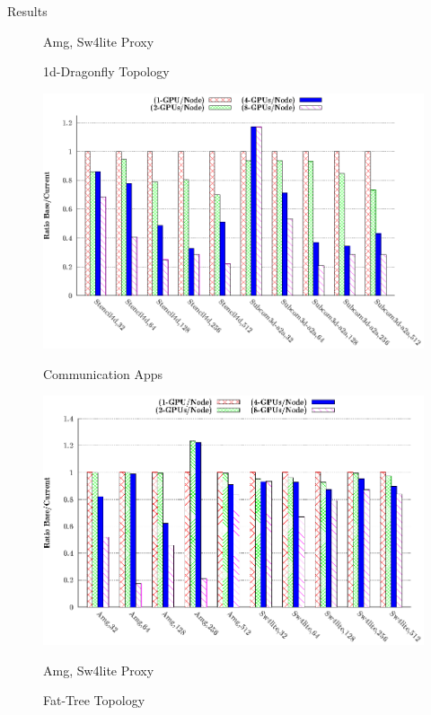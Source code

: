 \documentclass[final]{beamer}
\newlength{\onecolwid}
\newlength{\twocolwid}
\begin{document}
\begin{frame}[t]
\begin{columns}[t]
\begin{column}{\twocolwid}
\begin{columns}[t,totalwidth=\twocolwid]
\begin{column}{\onecolwid}
\begin{block}{Results}
\begin{figure}
\begin{minipage}{.45\textwidth}
\captionsetup{labelformat=empty}
\caption{Amg, Sw4lite Proxy}
\label{fig:13b}
\end{minipage}
\captionsetup{labelformat=empty}
\caption{1d-Dragonfly Topology}
\end{figure}

\begin{figure}
\centering
\begin{minipage}{.45\textwidth}
\centering
\includegraphics[width=1\linewidth]{figs/ftree-x-mapping-comm.eps}
\captionsetup{labelformat=empty}
\caption{Communication Apps}
\label{fig:13a}
\end{minipage}
\begin{minipage}{.45\textwidth}
\centering
\includegraphics[width=1\linewidth]{figs/ftree-x-mapping-comp-new.eps}
\captionsetup{labelformat=empty}
\caption{Amg, Sw4lite Proxy}
\label{fig:13b}
\end{minipage}
\captionsetup{labelformat=empty}
\caption{Fat-Tree Topology}
\end{figure}





\end{block}
\end{column}
\end{columns}
\end{column}
\end{columns}
\end{frame}
\end{document}
